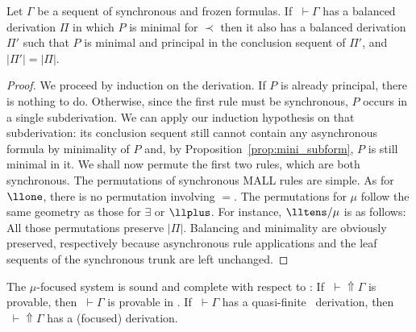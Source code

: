 \begin{lemma} \label{lem:sync}
Let $\Gamma$ be a sequent of synchronous and frozen formulas.
If $\;\vdash\Gamma$
has a balanced derivation $\Pi$ in which $P$ is minimal for $\prec$
then it also has a balanced derivation $\Pi'$ such that
$P$ is minimal and principal in the conclusion sequent of $\Pi'$,
and $|\Pi'|=|\Pi|$.
\end{lemma}

\begin{proof}
We proceed by induction on the derivation.
If $P$ is already principal, there is nothing to do.
Otherwise, since the first rule must be synchronous,
$P$ occurs in a single subderivation.
We can apply our induction hypothesis on that subderivation:
its conclusion sequent still cannot contain any asynchronous formula by
minimality of $P$ and,
by Proposition~\ref{prop:mini_subform}, $P$ is still minimal in it.
We shall now permute the first two rules, which are both synchronous.
The permutations of synchronous MALL rules are simple.
As for $\llone$, there is no permutation involving $=$.
The permutations for $\mu$ follow the same geometry as those for $\exists$
or $\llplus$. For instance, ${\lltens}/{\mu}$ is as follows:
All those permutations preserve $|\Pi|$.
Balancing and minimality are obviously preserved, respectively
because asynchronous rule applications and
the leaf sequents of the synchronous trunk are left unchanged.
\end{proof}

\begin{theorem}
The $\mu$-focused system is sound and complete with respect to \mumall:
If $\;\vdash\Uparrow\Gamma$ is provable, then $\;\vdash\Gamma$
  is provable in \mumall.
If $\;\vdash\Gamma$ has a quasi-finite \mumall\ derivation,
  then $\;\vdash\Uparrow\Gamma$ has a (focused) derivation.
\end{theorem}

